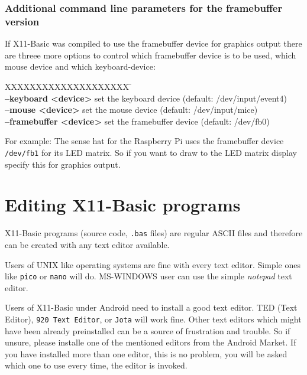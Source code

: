 \subsubsection*{Additional command line parameters for the framebuffer version}

If X11-Basic was compiled to use the framebuffer device for graphics output there are
threee more options to control which framebuffer device is to be used, which mouse 
device and which keyboard-device:

\begin{tabbing}
XXXXXXXXXXXXXXXXXXXX \=\kill\\
  {\bf --keyboard <device>}   \> set the keyboard device (default: /dev/input/event4)  \\
  {\bf --mouse <device>}   \> set the mouse device (default: /dev/input/mice)  \\
  {\bf --framebuffer <device>}   \> set the framebuffer device (default: /dev/fb0)  \\
\end{tabbing}

For example: The sense hat for the Raspberry Pi uses the framebuffer device
\verb|/dev/fb1| for its LED matrix. So if you want to draw to the LED matrix 
display specify this for graphics output.


\section{Editing X11-Basic programs}

X11-Basic programs (source code, \verb|.bas| files) are regular ASCII files and
therefore can be created with any text editor available.  

Users of UNIX like operating systems are fine with every text editor. Simple 
ones like \verb|pico| or \verb|nano| will do. MS-WINDOWS user can use the simple 
{\it notepad} text editor.

Users of X11-Basic under Android need to install a good text editor. TED (Text
Editor), \verb|920 Text Editor|, or \verb|Jota| will work fine. Other text
editors which might have been already preinstalled can be a source of
frustration and trouble. So if unsure, please installe one of the mentioned
editors from the Android Market. If you have installed more than one editor,
this is no problem, you will be asked which one to use every time, the editor
is invoked. 

